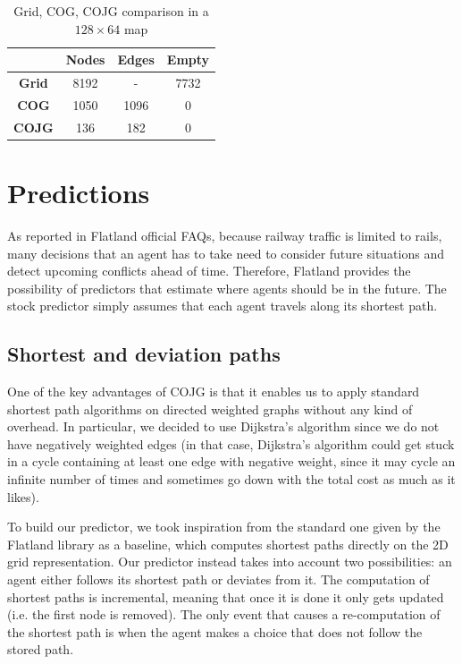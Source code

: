 \documentclass[a4paper,10pt]{report}
\begin{document}
\begin{table}[h]
	\center
	\begin{tabular}{||c c c c||}
		\hline
		              & \textbf{Nodes} & \textbf{Edges} & \textbf{Empty} \\ [0.5ex]
		\hline\hline
		\textbf{Grid} & \num{8192}     & -              & \num{7732}     \\
		\hline
		\textbf{COG}  & 1050           & 1096           & 0              \\
		\hline
		\textbf{COJG} & 136            & 182            & 0              \\
		\hline
	\end{tabular}
	\caption{Grid, COG, COJG comparison in a $128\times 64$ map}
	\label{table:grid-cog-cojg-128x64}
\end{table}
\clearpage

\section{Predictions}\label{sec:predictions}
As reported in Flatland official FAQs, because railway traffic is limited to rails, many decisions that an agent has to take need to consider future situations and detect upcoming conflicts ahead of time. Therefore, Flatland provides the possibility of predictors that estimate where agents should be in the future. The stock predictor simply assumes that each agent travels along its shortest path.

\subsection{Shortest and deviation paths}\label{subsec:shortest-deviation-pred}
One of the key advantages of COJG is that it enables us to apply standard shortest path algorithms on directed weighted graphs without any kind of overhead. In particular, we decided to use Dijkstra's algorithm since we do not have negatively weighted edges (in that case, Dijkstra's algorithm could get stuck in a cycle containing at least one edge with negative weight, since it may cycle an infinite number of times and sometimes go down with the total cost as much as it likes).

To build our predictor, we took inspiration from the standard one given by the Flatland library as a baseline, which computes shortest paths directly on the 2D grid representation. Our predictor instead takes into account two possibilities: an agent either follows its shortest path or deviates from it. The computation of shortest paths is incremental, meaning that once it is done it only gets updated (i.e. the first node is removed). The only event that causes a re-computation of the shortest path is when the agent makes a choice that does not follow the stored path.
\end{document}
